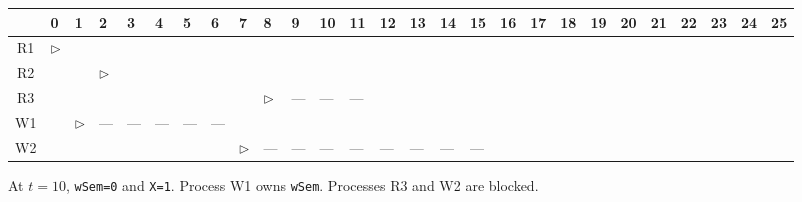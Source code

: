 \documentclass{sope}
\begin{document}
\begin{center}
    \footnotesize
    \setlength{\tabcolsep}{3pt}
    \begin{tabular}{c | p{3.5mm} | p{3.5mm} | p{3.5mm} | p{3.5mm} | p{3.5mm} | p{3.5mm} | p{3.5mm} | p{3.5mm} | p{3.5mm} | p{3.5mm} | p{3.5mm} | p{3.5mm} | p{3.5mm} | p{3.5mm} | p{3.5mm} | p{3.5mm} | p{3.5mm} | p{3.5mm} | p{3.5mm} | p{3.5mm} | p{3.5mm} | p{3.5mm} | p{3.5mm} | p{3.5mm} | p{3.5mm} | p{3.5mm}}
           & 0 & 1 & 2 & 3 & 4 & 5 & 6 & 7 & 8 & 9 & 10 & 11 & 12 & 13 & 14 & 15 & 16 & 17 & 18 & 19 & 20 & 21 & 22 & 23 & 24 & 25 \\ \hline
        R1 & $\triangleright$ & \cellcolor{gray!70} &\cellcolor{gray!70}&\cellcolor{gray!70}&\cellcolor{gray!70}&   &   &   &   &   &    &    &    &    &    &    &    &    &    &    &    &    &    &    &    &    \\ \hline
        R2 &   &   & $\triangleright$ &\cellcolor{gray!70}&\cellcolor{gray!70}&\cellcolor{gray!70}&\cellcolor{gray!70}&   &   &   &    &    &    &    &    &    &    &    &    &    &    &    &    &    &    &    \\ \hline
        R3 &   &   &   &   &   &   &   &   & $\triangleright$ &---&--- &--- &\cellcolor{gray!70} &\cellcolor{gray!70} &\cellcolor{gray!70} &\cellcolor{gray!70} &    &    &    &    &    &    &    &    &    &    \\ \hline
        W1 &   & $\triangleright$ &---&---&---&---&---&\cellcolor{gray!70}&\cellcolor{gray!70}&\cellcolor{gray!70}&\cellcolor{gray!70} &\cellcolor{gray!70} &    &    &    &    &    &    &    &    &    &    &    &    &    &    \\ \hline
        W2 &   &   &   &   &   &   &   & $\triangleright$ &---&---&--- &--- &--- &--- &--- &--- &\cellcolor{gray!70} &\cellcolor{gray!70} &\cellcolor{gray!70} &\cellcolor{gray!70} &\cellcolor{gray!70} &    &    &    &    &    
    \end{tabular}
\end{center}

At $t=10$, \texttt{wSem=0} and \texttt{X=1}. Process W1 owns \texttt{wSem}. Processes R3 and W2 are blocked.


\end{document}
